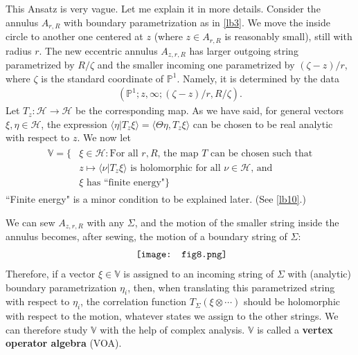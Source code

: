 \documentclass[12pt,a4paper,notitlepage]{article}
\theoremstyle{definition}
\theoremstyle{plain}
\newcommand{\mc}{\mathcal}
\newcommand{\bk}[1]{\langle {#1}\rangle}
\newcommand{\Vbb}{\mathbb V}
\newcommand{\Pbb}{\mathbb P}
\numberwithin{equation}{section}
\begin{document}
This Ansatz is very vague. Let me explain it in more details. Consider the annulus $A_{r,R}$ with boundary parametrization as in \ref{lb3}. We move the inside circle to another one centered at $z$ (where $z\in A_{r,R}$ is reasonably small), still with radius $r$. The new eccentric annulus $A_{z,r,R}$ has larger outgoing string parametrized by $R/\zeta$ and the smaller incoming one parametrized by $(\zeta-z)/r$, where $\zeta$ is the standard coordinate of $\Pbb^1$. Namely, it is determined by the data
\begin{align}
(\Pbb^1;z,\infty;(\zeta-z)/r,R/\zeta).	\label{eq224}
\end{align}
Let $T_z:\mc H\rightarrow\mc H$ be the corresponding map. As we have said, for general vectors $\xi,\eta\in\mc H$, the expression $\bk{\eta|T_z\xi}=\bk{\Theta\eta,T_z\xi}$ can be chosen to be real analytic with respect to $z$. We now let
\begin{align}\label{eq2}
	\begin{aligned}
\Vbb=\{&\xi\in\mc H:\text{For all $r,R$, the map $T$ can be chosen such that} \\
	&\text{$z\mapsto\bk{\nu|T_z\xi}$ is holomorphic for all $\nu\in\mc H$, and}\\
	&\text{$\xi$ has ``finite energy"}\}		
	\end{aligned}	
\end{align}
``Finite energy" is a minor condition to be explained later. (See \ref{lb10}.)

We can sew $A_{z,r,R}$ with any $\Sigma$, and the motion of the smaller string inside the annulus becomes, after sewing, the motion of a boundary string of $\Sigma$: 
\begin{align}
	\vcenter{\hbox{{
				\texttt{[image: fig8.png]}}}}\label{eq176}
\end{align}
Therefore, if a vector $\xi\in \Vbb$ is assigned to an incoming string of $\Sigma$ with (analytic) boundary parametrization $\eta_i$, then, when translating this parametrized string with respect to $\eta_i$, the correlation function $T_\Sigma(\xi\otimes\cdots)$ should be holomorphic with respect to the motion, whatever states we assign to the other strings.  We can therefore study $\Vbb$ with the help of complex analysis. $\Vbb$ is called a \textbf{vertex operator algebra} (VOA).
\end{document}
